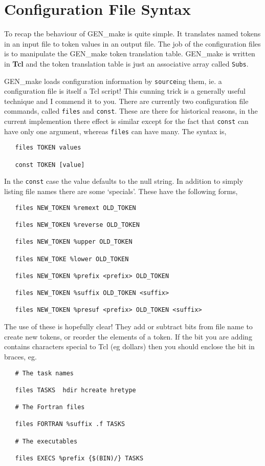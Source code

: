 \section{Configuration File Syntax}

To recap the behaviour of GEN\_make is quite simple. It translates named
tokens in an input file to token values in an output file. The job of
the configuration files is to manipulate the GEN\_make token translation
table. GEN\_make is written in {\bf Tcl} and the token translation table
is just an associative array called \verb+Subs+.

GEN\_make loads configuration information by \verb+source+ing them, ie. a
configuration file is itself a Tcl script! This cunning trick is a 
generally useful technique and I commend it to you. There are currently
two configuration file commands, called \verb+files+ and \verb+const+.
These are there for historical reasons, in the current implemention
there effect is similar except for the fact that \verb+const+ can have only
one argument, whereas \verb+files+ can have many. The syntax is,
\begin{verbatim}
   files TOKEN values
   
   const TOKEN [value]
\end{verbatim}
In the \verb+const+ case the value defaults to the null string. In 
addition to simply listing file names there are some `specials'. 
These have the following forms,
\begin{verbatim}
   files NEW_TOKEN %remext OLD_TOKEN

   files NEW_TOKEN %reverse OLD_TOKEN
   
   files NEW_TOKEN %upper OLD_TOKEN
   
   files NEW_TOKE %lower OLD_TOKEN
   
   files NEW_TOKEN %prefix <prefix> OLD_TOKEN
   
   files NEW_TOKEN %suffix OLD_TOKEN <suffix>
   
   files NEW_TOKEN %presuf <prefix> OLD_TOKEN <suffix>
\end{verbatim}
The use of these is hopefully clear! They add or subtract bits from
file name to create new tokens, or reorder the elements of a token. 
If the bit you are adding contains
characters special to Tcl (eg dollars) then you should enclose the
bit in braces, eg.

\begin{verbatim}
   # The task names
   
   files TASKS  hdir hcreate hretype

   # The Fortran files
   
   files FORTRAN %suffix .f TASKS
   
   # The executables
   
   files EXECS %prefix {$(BIN)/} TASKS
\end{verbatim}

